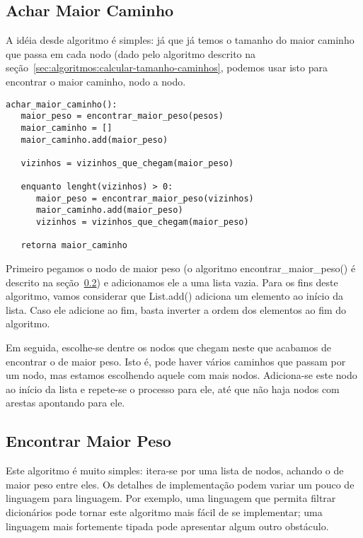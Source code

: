\documentclass[12pt]{article}
\begin{document}

\subsection{Achar Maior Caminho}\label{sec:algoritmos:achar-maior-caminho}
A idéia desde algoritmo é simples: já que já temos o tamanho do maior caminho que passa em cada nodo (dado pelo algoritmo descrito na se\c{c}ão~\ref{sec:algoritmos:calcular-tamanho-caminhos}, podemos usar isto para encontrar o maior caminho, nodo a nodo.

\begin{lstlisting}
achar_maior_caminho():
   maior_peso = encontrar_maior_peso(pesos)
   maior_caminho = []
   maior_caminho.add(maior_peso)

   vizinhos = vizinhos_que_chegam(maior_peso)

   enquanto lenght(vizinhos) > 0:
      maior_peso = encontrar_maior_peso(vizinhos)
      maior_caminho.add(maior_peso)
      vizinhos = vizinhos_que_chegam(maior_peso)

   retorna maior_caminho
\end{lstlisting}

Primeiro pegamos o nodo de maior peso (o algoritmo {\sf encontrar\_maior\_peso()} é descrito na se\c{c}ão~\ref{sec:algoritmos:encontrar-maior-peso}) e adicionamos ele a uma lista vazia. Para os fins deste algoritmo, vamos considerar que {\sf List.add()} adiciona um elemento ao início da lista. Caso ele adicione ao fim, basta inverter a ordem dos elementos ao fim do algoritmo.

Em seguida, escolhe-se dentre os nodos que chegam neste que acabamos de encontrar o de maior peso. Isto é, pode haver vários caminhos que passam por um nodo, mas estamos escolhendo aquele com mais nodos. Adiciona-se este nodo ao início da lista e repete-se o processo para ele, até que não haja nodos com arestas apontando para ele.


\subsection{Encontrar Maior Peso}\label{sec:algoritmos:encontrar-maior-peso}
Este algoritmo é muito simples: itera-se por uma lista de nodos, achando o de maior peso entre eles. Os detalhes de implementa\c{c}ão podem variar um pouco de linguagem para linguagem. Por exemplo, uma linguagem que permita filtrar dicionários pode tornar este algoritmo mais fácil de se implementar; uma linguagem mais fortemente tipada pode apresentar algum outro obstáculo.
\end{document}

